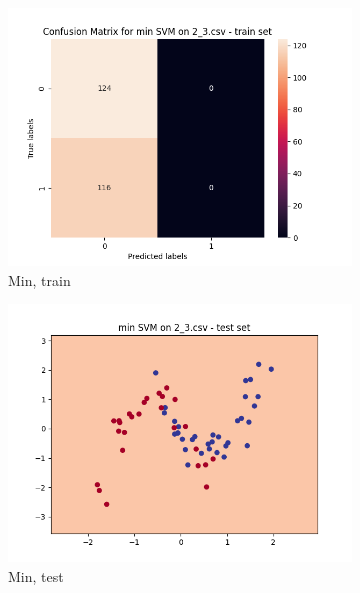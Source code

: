 \documentclass[12pt]{article}
\newcommand*{\subfigwidth}{0.24\textwidth}
\begin{document}
\begin{figure}[H]
\begin{subfigure}[t]{\subfigwidth}
        \includegraphics[width=\linewidth]{img/exp_2/svm/2_3/min/train_matrix.png}
        \caption{Min, train}
    \end{subfigure}
    \hfill
    \begin{subfigure}[t]{\subfigwidth}
        \includegraphics[width=\linewidth]{img/exp_2/svm/2_3/min/test_boundary.png}
        \caption{Min, test}
    \end{subfigure}
    \hfill
    \begin{subfigure}[t]{\subfigwidth}

\end{subfigure}
\end{figure}
\end{document}

